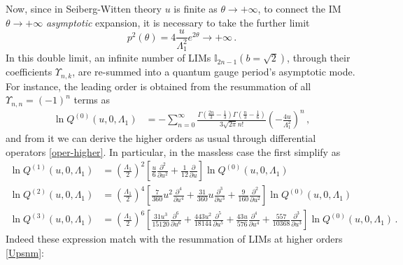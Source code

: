 \documentclass[11pt,a4paper]{elsarticle}
\def \th {\theta}
\def \ba {\begin{aligned}}
\def \ea {\end{aligned}}
\newcommand{\be}{\begin{equation}}
\newcommand{\ee}{\end{equation}}
\def\th{\theta}
\numberwithin{figure}{section}
\numberwithin{table}{section}
\begin{document}
Now, since in Seiberg-Witten theory $u$ is finite as $\theta \to +\infty$, to connect the IM $\th \to + \infty$ \textit{asymptotic} expansion, it is necessary to take the further limit 
\be 
p^2(\theta) =  4\frac{u}{\Lambda_1^2} e^{2 \theta} \to +\infty\,.\ee
In this double limit, an infinite number of LIMs $\mathbb{I}_{2n-1}(b=\sqrt{2})$, through their coefficients $\Upsilon_{n,k}$, are re-summed into a quantum gauge period's asymptotic mode. For instance, the leading order is obtained from the resummation of all $\Upsilon_{n,n}=(-1)^n$ terms as
\begin{align}%
\ln Q^{(0)}(u,0,\Lambda_1)&=-  \sum _{n=0}^\infty \frac{\Gamma \left(\frac{2n }{3}-\frac{1}{3} \right) \Gamma \left(\frac{n}{3}-\frac{1}{6}\right)}{3 \sqrt{2\pi} n!} \left(-\frac{ 4u}{\Lambda_1^2}\right)^n \,,
\end{align}
and from it we can derive the higher orders as usual through differential operators \eqref{oper-higher}.
In particular, in the massless case the first simplify as
\be
\ba
\ln Q^{(1)}(u,0,\Lambda_1) &= \left(\frac{\Lambda_1}{2}\right)^2\left [ \frac{u}{6} \frac{\partial^2}{\partial u^2} + \frac{1}{12} \frac{\partial }{\partial u}\right]  \ln Q^{(0)}(u,0,\Lambda_1)\\
\ln Q^{(2)}(u,0,\Lambda_1) &= \left(\frac{\Lambda_1}{2}\right)^4\left [\frac{7}{360}u^2 \frac{\partial^4}{\partial u^4}+\frac{31}{360}u   \frac{\partial^3}{\partial u^3} + \frac{9}{160} \frac{\partial^2 }{\partial u^2}\right]  \ln Q^{(0)}(u,0,\Lambda_1)\\
\ln Q^{(3)}(u,0,\Lambda_1)&=  \left(\frac{\Lambda_1}{2}\right)^6 \left[\frac{31 u^3}{15120}\frac{\partial^6}{\partial u^6}+\frac{443 u^2}{18144}\frac{\partial^5}{\partial u^5} +\frac{43 u}{576}\frac{\partial^4}{\partial u^4} +\frac{557}{10368}\frac{\partial^3}{\partial u^3}\right]\ln Q^{(0)}(u,0,\Lambda_1)\,.
\ea
\ee
Indeed these expression match with the resummation of LIMs at higher orders \eqref{Upsnm}:
\end{document}
